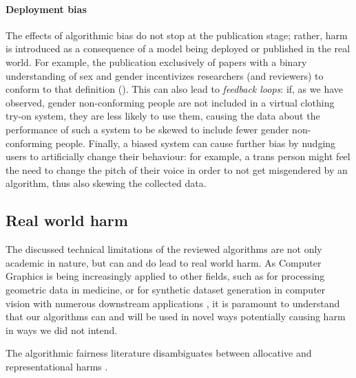 \documentclass[nonacm,sigconf,review,balance=false]{acmart}
\begin{document}




\paragraph*{Deployment bias} The effects of algorithmic bias do not stop at the publication stage; rather, harm is introduced as a consequence of a model being deployed or published in the real world. For example, the publication exclusively of papers with a binary understanding of sex and gender incentivizes researchers (and reviewers) to conform to that definition (\binary).
This can also lead to \emph{feedback loops}: if, as we have observed, gender non-conforming people are not included in a virtual clothing try-on system, they are less likely to use them, causing the data about the performance of such a system to be skewed to include fewer gender non-conforming people. Finally, a biased system can cause further bias by nudging users to artificially change their behaviour: for example, a trans person might feel the need to change the pitch of their voice in order to not get misgendered by an algorithm, thus also skewing the collected data.

\subsection{Real world harm}

The discussed technical limitations of the reviewed algorithms are not only academic in nature, but can and do lead to real world harm. As Computer Graphics is being increasingly applied to other fields, such as for processing geometric data in medicine, or for synthetic dataset generation in computer vision with numerous downstream applications \cite{cars, chen2021synthetic, dhs}, it is paramount to understand that our algorithms can and will be used in novel ways potentially causing harm in ways we did not intend.

The algorithmic fairness literature disambiguates between allocative and representational harms \cite{barocas-hardt-narayanan}.
\end{document}

